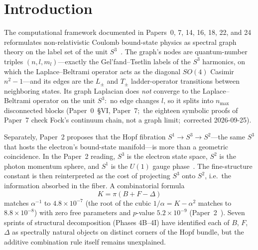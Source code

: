 \documentclass[aps,pra,twocolumn,superscriptaddress,longbibliography]{revtex4-2}
\begin{document}
\maketitle


\section{Introduction}
\label{sec:introduction}

The computational framework documented in Papers~0, 7, 14, 16, 18,
22, and 24 reformulates non-relativistic Coulomb bound-state physics
as spectral graph theory on the label set of the unit
$S^3$~\cite{Paper0,Paper7,Paper14,Paper16,Paper18,Paper22,Paper24}.
The graph's nodes are quantum-number triples $(n, l, m_l)$---exactly
the Gel'fand--Tsetlin labels of the $S^3$ harmonics, on which the
Laplace--Beltrami operator acts as the diagonal $SO(4)$ Casimir
$n^2-1$---and its edges are the $L_\pm$ and $T_\pm$ ladder-operator
transitions between neighboring states.  Its graph Laplacian does
\emph{not} converge to the Laplace--Beltrami operator on the unit
$S^3$:\ no edge changes $l$, so it splits into $n_{\max}$
disconnected blocks (Paper~0~\S VI, Paper~7;\ the eighteen symbolic
proofs of Paper~7 check Fock's continuum chain, not a graph limit;\
corrected 2026-09-25).

Separately, Paper~2 proposes that the Hopf fibration
$S^1 \to S^3 \to S^2$---the same $S^3$ that hosts the electron's
bound-state manifold---is more than a geometric coincidence.  In the
Paper~2 reading, $S^3$ is the electron state space, $S^2$ is the
photon momentum sphere, and $S^1$ is the $U(1)$ gauge
phase~\cite{Paper2}.  The fine-structure constant is then
reinterpreted as the cost of projecting $S^3$ onto $S^2$, i.e.\ the
information absorbed in the fiber.  A combinatorial formula
\begin{equation}
K = \pi \left( B + F - \Delta \right)
\label{eq:K_intro}
\end{equation}
matches $\alpha^{-1}$ to $4.8\times 10^{-7}$ (the root of the
cubic $1/\alpha = K - \alpha^2$ matches to $8.8 \times 10^{-8}$) with zero free
parameters and $p$-value $5.2 \times 10^{-9}$
(Paper~2~\cite{Paper2}).  Seven sprints of structural decomposition
(Phases 4B--4I) have identified each of $B$, $F$, $\Delta$ as
spectrally natural objects on distinct corners of the Hopf bundle,
but the additive combination rule itself remains unexplained.
\end{document}
